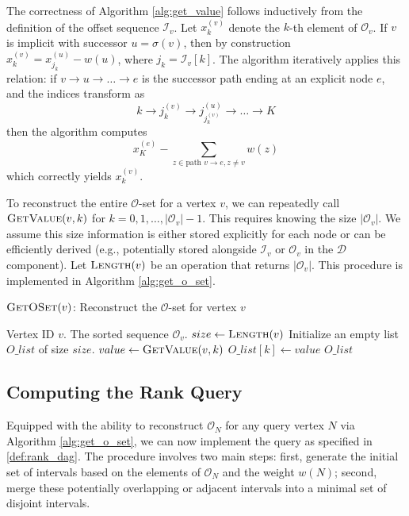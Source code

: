 The correctness of Algorithm \ref{alg:get_value} follows inductively from the definition of the offset sequence $\mathcal{I}_v$. Let $x_k^{(v)}$ denote the $k$-th element of $\mathcal{O}_v$. If $v$ is implicit with successor $u = \sigma(v)$, then by construction $x_k^{(v)} = x_{j_k}^{(u)} - w(u)$, where $j_k = \mathcal{I}_v[k]$. The algorithm iteratively applies this relation: if $v \to u \to \dots \to e$ is the successor path ending at an explicit node $e$, and the indices transform as
\[ k \to j_k^{(v)} \to j_{j_k^{(v)}}^{(u)} \to \dots \to K \]
then the algorithm computes
\[x_K^{(e)} - \sum_{z \in \text{path } v \to e, z \neq v} w(z)\]
which correctly yields $x_k^{(v)}$.

To reconstruct the entire $\mathcal{O}$-set for a vertex $v$, we can repeatedly call $\textsc{GetValue}(v, k)$ for $k=0, 1, \dots, |\mathcal{O}_v|-1$. This requires knowing the size $|\mathcal{O}_v|$. We assume this size information is either stored explicitly for each node or can be efficiently derived (e.g., potentially stored alongside $\mathcal{I}_v$ or $\mathcal{O}_v$ in the $\mathcal{D}$ component). Let $\textsc{Length}(v)$ be an operation that returns $|\mathcal{O}_v|$. This procedure is implemented in Algorithm \ref{alg:get_o_set}.

\begin{algorithm}
    \caption{$\textsc{GetOSet}(v)$: Reconstruct the $\mathcal{O}$-set for vertex $v$}
    \label{alg:get_o_set}
    \small
    \begin{algorithmic}[1]
        \Require Vertex ID $v$.
        \Ensure The sorted sequence $\mathcal{O}_v$.
        \State $size \gets \textsc{Length}(v)$
        \State Initialize an empty list $O\_list$ of size $size$.
        \State $value \gets \textsc{GetValue}(v, k)$
        \State $O\_list[k] \gets value$
        \EndFor
        \State \Return $O\_list$
    \end{algorithmic}
\end{algorithm}

\subsection{Computing the Rank Query}
\label{subsec:computing_rank}

Equipped with the ability to reconstruct $\mathcal{O}_N$ for any query vertex $N$ via Algorithm \ref{alg:get_o_set}, we can now implement the \Rank{} query as specified in \ref{def:rank_dag}. The procedure involves two main steps: first, generate the initial set of intervals based on the elements of $\mathcal{O}_N$ and the weight $w(N)$; second, merge these potentially overlapping or adjacent intervals into a minimal set of disjoint intervals.

